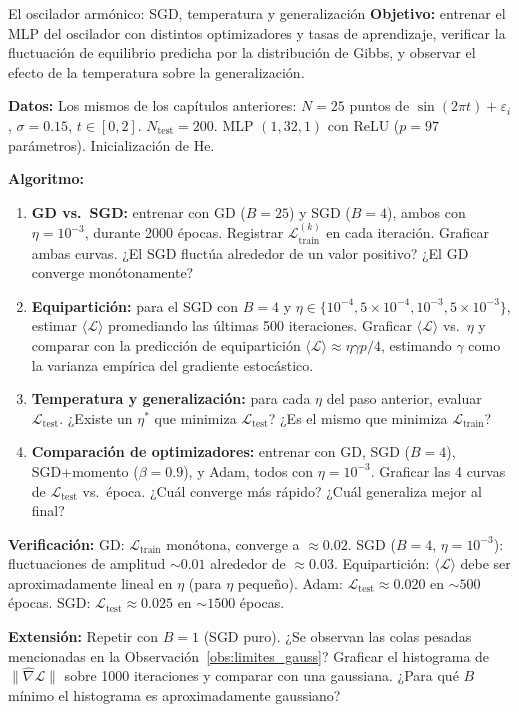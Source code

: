 \begin{ejerciciocomp}{El oscilador armónico: SGD, temperatura y generalización}
\label{ejcomp:oscilador5}
\textbf{Objetivo:} entrenar el MLP del oscilador con distintos optimizadores
y tasas de aprendizaje, verificar la fluctuación de equilibrio predicha por
la distribución de Gibbs, y observar el efecto de la temperatura sobre la
generalización.

\medskip\noindent\textbf{Datos:}
Los mismos de los capítulos anteriores: $N = 25$ puntos de $\sin(2\pi t)
+ \varepsilon_i$, $\sigma = 0.15$, $t \in [0, 2]$. $N_{\text{test}} = 200$.
MLP $(1, 32, 1)$ con ReLU ($p = 97$ parámetros). Inicialización de He.

\medskip\noindent\textbf{Algoritmo:}
\begin{enumerate}
  \item \textbf{GD vs.\ SGD:} entrenar con GD ($B = 25$) y SGD ($B = 4$),
        ambos con $\eta = 10^{-3}$, durante 2000 épocas. Registrar
        $\mathcal{L}_{\text{train}}^{(k)}$ en cada iteración. Graficar
        ambas curvas. ¿El SGD fluctúa alrededor de un valor positivo? ¿El
        GD converge monótonamente?
  \item \textbf{Equipartición:} para el SGD con $B = 4$ y
        $\eta \in \{10^{-4}, 5\times 10^{-4}, 10^{-3}, 5\times 10^{-3}\}$,
        estimar $\langle\mathcal{L}\rangle$ promediando las últimas 500
        iteraciones. Graficar $\langle\mathcal{L}\rangle$ vs.\ $\eta$ y
        comparar con la predicción de equipartición
        $\langle\mathcal{L}\rangle \approx \eta\gamma p/4$, estimando
        $\gamma$ como la varianza empírica del gradiente estocástico.
  \item \textbf{Temperatura y generalización:} para cada $\eta$ del paso
        anterior, evaluar $\mathcal{L}_{\text{test}}$. ¿Existe un $\eta^*$
        que minimiza $\mathcal{L}_{\text{test}}$? ¿Es el mismo que minimiza
        $\mathcal{L}_{\text{train}}$?
  \item \textbf{Comparación de optimizadores:} entrenar con GD, SGD
        ($B = 4$), SGD+momento ($\beta = 0.9$), y Adam, todos con
        $\eta = 10^{-3}$. Graficar las 4 curvas de
        $\mathcal{L}_{\text{test}}$ vs.\ época. ¿Cuál converge más rápido?
        ¿Cuál generaliza mejor al final?
\end{enumerate}

\medskip\noindent\textbf{Verificación:}
GD: $\mathcal{L}_{\text{train}}$ monótona, converge a $\approx 0.02$.
SGD ($B=4$, $\eta=10^{-3}$): fluctuaciones de amplitud $\sim 0.01$
alrededor de $\approx 0.03$.
Equipartición: $\langle\mathcal{L}\rangle$ debe ser aproximadamente
lineal en $\eta$ (para $\eta$ pequeño).
Adam: $\mathcal{L}_{\text{test}} \approx 0.020$ en $\sim 500$ épocas.
SGD: $\mathcal{L}_{\text{test}} \approx 0.025$ en $\sim 1500$ épocas.

\medskip\noindent\textbf{Extensión:}
Repetir con $B = 1$ (SGD puro). ¿Se observan las colas pesadas
mencionadas en la Observación~\ref{obs:limites_gauss}? Graficar el
histograma de $\|\hat{\nabla}\mathcal{L}\|$ sobre 1000 iteraciones y
comparar con una gaussiana. ¿Para qué $B$ mínimo el histograma es
aproximadamente gaussiano?
\end{ejerciciocomp}



